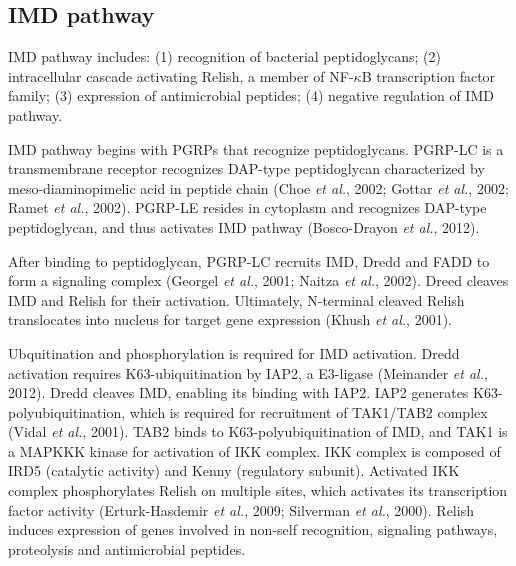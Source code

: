 \documentclass[11pt]{article}
\begin{document}
\subsection{IMD pathway}
IMD pathway includes: 
(1) recognition of bacterial peptidoglycans; 
(2) intracellular cascade activating Relish, a member of NF-$\kappa$B transcription factor family; 
(3) expression of antimicrobial peptides; 
(4) negative regulation of IMD pathway. 

\newline

IMD pathway begins with PGRPs that recognize peptidoglycans. 
PGRP-LC is a transmembrane receptor recognizes DAP-type peptidoglycan characterized by meso-diaminopimelic acid in peptide chain (Choe \textit{et al.}, 2002; Gottar \textit{et al.}, 2002; Ramet \textit{et al.}, 2002). 
PGRP-LE resides in cytoplasm and recognizes DAP-type peptidoglycan, and thus activates IMD pathway (Bosco-Drayon \textit{et al.}, 2012). 

\newline

After binding to peptidoglycan, PGRP-LC recruits IMD, Dredd and FADD to form a signaling complex (Georgel \textit{et al.}, 2001; Naitza \textit{et al.}, 2002). 
Dreed cleaves IMD and Relish for their activation. 
Ultimately, N-terminal cleaved Relish translocates into nucleus for target gene expression (Khush \textit{et al.}, 2001). 

\newline

Ubquitination and phosphorylation is required for IMD activation. 
Dredd activation requires K63-ubiquitination by IAP2, a E3-ligase (Meinander \textit{et al.}, 2012). 
Dredd cleaves IMD, enabling its binding with IAP2. 
IAP2 generates K63-polyubiquitination, which is required for recruitment of TAK1/TAB2 complex (Vidal \textit{et al.}, 2001). 
TAB2 binds to K63-polyubiquitination of IMD, and TAK1 is a MAPKKK kinase for activation of IKK complex. 
IKK complex is composed of IRD5 (catalytic activity) and Kenny (regulatory subunit). 
Activated IKK complex phosphorylates Relish on multiple sites, which activates its transcription factor activity (Erturk-Hasdemir \textit{et al.}, 2009; Silverman \textit{et al.}, 2000). 
Relish induces expression of genes involved in non-self recognition, signaling pathways, proteolysis and antimicrobial peptides. 

\newline
\end{document}
